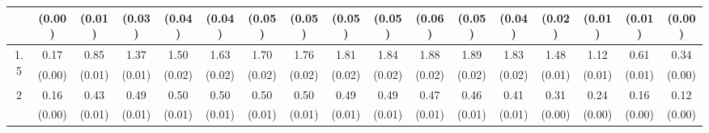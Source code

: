 \documentclass[12pt]{article}  %
\theoremstyle{plain}
\begin{document}
\begin{sidewaystable}[htbp]
\begin{tabular}{ccccccccccccccccc}
                       & (0.00)&   (0.01)& (0.03)& (0.04)& (0.04)& (0.05)& (0.05)& (0.05)& (0.05)&  (0.06)&  (0.05)&  (0.04)&  (0.02)&  (0.01)&  (0.01)& (0.00)\\ \hline                                                                                                                                                                                                                                                                                    
\multirow{2}{*}{1.5}  &  0.17 &0.85 & 1.37 & 1.50 & 1.63 &  1.70  & 1.76  & 1.81 &  1.84 & 1.88  &1.89 & 1.83 & 1.48 & 1.12 & 0.61 & 0.34\\
                      &  (0.00)&   (0.01)&  (0.01)& (0.02)& (0.02)& (0.02)& (0.02)& (0.02)& (0.02)&  (0.02)&  (0.02)&  (0.02)&  (0.01)&  (0.01)&  (0.01)& (0.00)\\ \hline                                                                                                                                                                                                                                                                                    
\multirow{2}{*}{2}  &0.16& 0.43 & 0.49 & 0.50 & 0.50 &  0.50  & 0.50 &  0.49  & 0.49 & 0.47 & 0.46 & 0.41 & 0.31  &0.24 & 0.16 & 0.12
\\
                      &  (0.00) & (0.01)& (0.01)& (0.01)& (0.01)& (0.01)& (0.01)& (0.01)& (0.01)&  (0.01)&  (0.01) & (0.01) & (0.00) & (0.00) & (0.00) & (0.00)\\ \hline                                                                                                                                                                                                                                                                                    
\end{tabular}
\end{sidewaystable}
\end{document}
